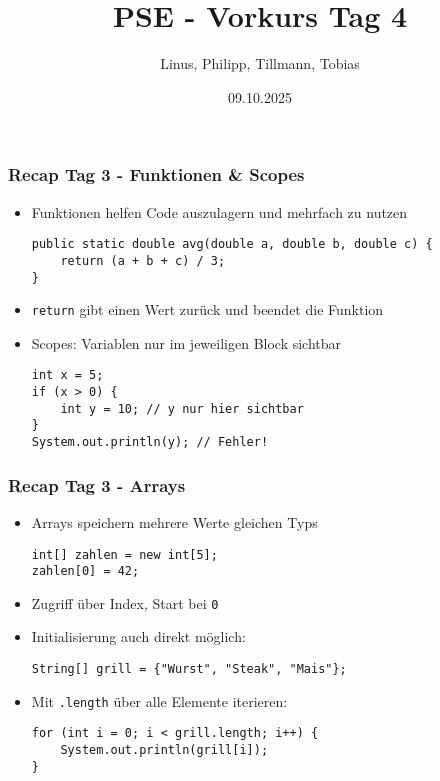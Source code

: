 \documentclass{../../presentation}
\title{PSE - Vorkurs Tag 4}
\author{Linus, Philipp, Tillmann, Tobias}
\institute{FIUS - Fachgruppe Informatik Universität Stuttgart}
\date{09.10.2025}
\begin{document}
\begin{frame}
	\titlepage
\end{frame}

\begin{frame}[fragile]
	\frametitle{Recap Tag 3 - Funktionen \& Scopes}

	\begin{itemize}
		\item\pause Funktionen helfen Code auszulagern und mehrfach zu nutzen
		      \begin{verbatim}
public static double avg(double a, double b, double c) {
    return (a + b + c) / 3;
}
          \end{verbatim}
		\item\pause \texttt{return} gibt einen Wert zurück und beendet die Funktion
		\item\pause Scopes: Variablen nur im jeweiligen Block sichtbar
		      \begin{verbatim}
int x = 5;
if (x > 0) {
    int y = 10; // y nur hier sichtbar
}
System.out.println(y); // Fehler!
          \end{verbatim}
	\end{itemize}
\end{frame}

\begin{frame}[fragile]
	\frametitle{Recap Tag 3 - Arrays}
	\pause
	\begin{itemize}
		\item\pause Arrays speichern mehrere Werte gleichen Typs
		      \begin{verbatim}
int[] zahlen = new int[5];
zahlen[0] = 42;
          \end{verbatim}
		\item\pause Zugriff über Index, Start bei \texttt{0}
		\item\pause Initialisierung auch direkt möglich:
		      \begin{verbatim}
String[] grill = {"Wurst", "Steak", "Mais"};
          \end{verbatim}
		\item Mit \texttt{.length} über alle Elemente iterieren:
		      \begin{verbatim}
for (int i = 0; i < grill.length; i++) {
    System.out.println(grill[i]);
}
          \end{verbatim}
	\end{itemize}
\end{frame}
\end{document}
